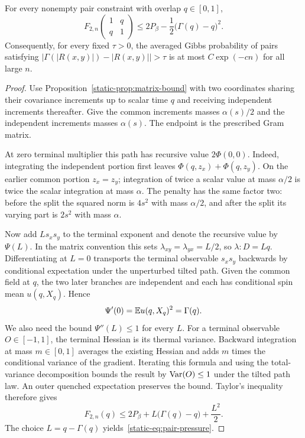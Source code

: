 \begin{lemma}
\label{static-lem:pair-bound}
For every nonempty pair constraint with overlap $q\in[0,1]$,
\begin{equation}
\label{static-eq:pair-pressure}
 F_{2,n}\!\left(\begin{smallmatrix}1&q\\q&1\end{smallmatrix}\right)
 \leq 2P_\beta-\frac12\bigl(\Gamma(q)-q\bigr)^2.
\end{equation}
Consequently, for every fixed $\tau>0$, the averaged Gibbs probability
of pairs satisfying
$\bigl|\Gamma(|R(x,y)|)-|R(x,y)|\bigr|>\tau$
is at most $C\exp(-cn)$ for all large $n$.
\end{lemma}

\begin{proof}
Use Proposition~\ref{static-prop:matrix-bound} with two coordinates
sharing their covariance increments up to scalar time $q$ and receiving
independent increments thereafter. Give the common increments masses
$\alpha(s)/2$ and the independent increments masses $\alpha(s)$.
The endpoint is the prescribed Gram matrix.

At zero terminal multiplier this path has recursive value
$2\Phi(0,0)$. Indeed, integrating the independent portion first leaves
$\Phi(q,z_x)+\Phi(q,z_y)$. On the earlier common portion $z_x=z_y$;
integration of twice a scalar value at mass $\alpha/2$ is twice the
scalar integration at mass $\alpha$. The penalty has the same factor
two: before the split the squared norm is $4s^2$ with mass $\alpha/2$,
and after the split its varying part is $2s^2$ with mass $\alpha$.

Now add $L s_xs_y$ to the terminal exponent and denote the recursive
value by $\Psi(L)$. In the matrix convention this sets
$\lambda_{xy}=\lambda_{yx}=L/2$, so $\lambda:D=Lq$. Differentiating at
$L=0$ transports the terminal observable $s_xs_y$ backwards by
conditional expectation under the unperturbed tilted path. Given the
common field at $q$, the two later branches are independent and each
has conditional spin mean $u(q,X_q)$. Hence
\[
 \Psi'(0)=\mathbb E u(q,X_q)^2=\Gamma(q).
\]
We also need the bound $\Psi''(L)\leq1$ for every $L$. For a terminal
observable $O\in[-1,1]$, the terminal Hessian is its thermal variance.
Backward integration at mass $m\in[0,1]$ averages the existing Hessian
and adds $m$ times the conditional variance of the gradient. Iterating
this formula and using the total-variance decomposition bounds the
result by $\operatorname{Var}(O)\leq1$ under the tilted path law. An outer quenched
expectation preserves the bound. Taylor's inequality therefore gives
\[
 F_{2,n}(q)\leq2P_\beta+L\bigl(\Gamma(q)-q\bigr)+\frac{L^2}{2}.
\]
The choice $L=q-\Gamma(q)$ yields~\eqref{static-eq:pair-pressure}.


\end{proof}
